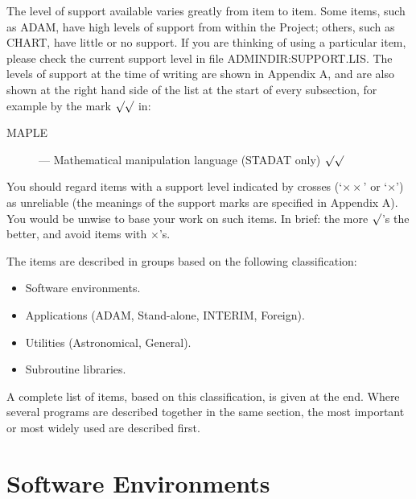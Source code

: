 The level of support available varies greatly from item to item.
Some items, such as ADAM, have high levels of support from within the Project;
others, such as CHART, have little or no support.
If you are thinking of using a particular item, please check the current
support level in file ADMINDIR:SUPPORT.LIS.
The levels of support at the time of writing are shown in Appendix A, and are
also shown at the right hand side of the list at the start of every
subsection, for example by the mark $\surd\surd$ in:
\begin{description}
\begin{description}
\item [MAPLE] --- Mathematical manipulation language (STADAT only) \hfill 
 $\surd\surd$
\end{description}
\end{description}
You should regard items with a support level indicated by crosses
(`$\times\times$' or `$\times$') as unreliable (the meanings of the support
marks are specified in Appendix A).
You would be unwise to base your work on such items.
In brief: the more $\surd$'s the better, and avoid items with $\times$'s.

The items are described in groups based on the following classification:
\begin{itemize}
\item Software environments.
\item Applications (ADAM, Stand-alone, INTERIM, Foreign).
\item Utilities (Astronomical, General).
\item Subroutine libraries.
\end{itemize}
A complete list of items, based on this classification, is given at the end.
Where several programs are described together in the same section, the most
important or most widely used are described first.

\newpage

\section {Software Environments}

